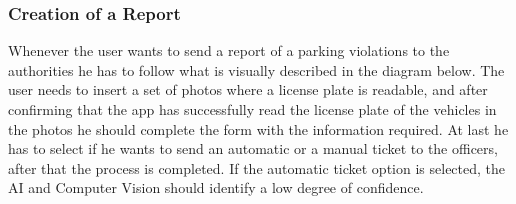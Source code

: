 \subsubsection{Creation of a Report}
Whenever the user wants to send a report of a parking violations to the authorities he has to follow what is visually described in the diagram below.
The user needs to insert a set of photos where a license plate is readable, and after confirming that the app has successfully read the license plate of the vehicles in the photos he should complete the form with the information required. At last he has to select if he wants to send an automatic or a manual ticket to the officers, after that the process is completed. If the automatic ticket option is selected, the AI and Computer Vision should identify a low degree of confidence.

\clearpage

